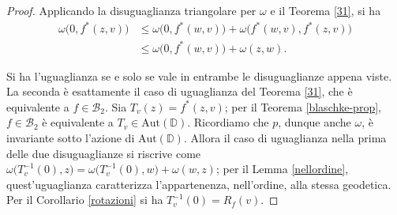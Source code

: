 \begin{proof}
  Applicando la disuguaglianza triangolare per $\omega$ e il Teorema \ref{31}, si ha
  \begin{align*}
    \omega\bigl(0,f^*(z,v)\bigr) & \le \omega\bigl(0,f^*(w,v)\bigr)+\omega\bigl(f^*(w,v),f^*(z,v)\bigr) \\
    & \le \omega\bigl(0,f^*(w,v)\bigr)+\omega(z,w).
  \end{align*}

  Si ha l'uguaglianza se e solo se vale in entrambe le disuguaglianze appena viste. La seconda è esattamente il caso di uguaglianza del Teorema \ref{31}, che è equivalente a $f \in \mathcal{B}_2$. Sia $T_v(z)=f^*(z,v)$; per il Teorema \ref{blaschke-prop}, $f \in \mathcal{B}_2$ è equivalente a $T_v \in \text{Aut}(\mathbb{D})$. Ricordiamo che $p$, dunque anche $\omega$, è invariante sotto l'azione di $\text{Aut}(\mathbb{D})$.
  Allora il caso di uguaglianza nella prima delle due disuguaglianze si riscrive come $\omega\bigl(T_v^{-1}(0),z\bigr)=\omega\bigl(T_v^{-1}(0),w\bigr)+\omega(w,z)$; per il Lemma \ref{nellordine}, quest'uguaglianza caratterizza l'appartenenza, nell'ordine, alla stessa geodetica. Per il Corollario \ref{rotazioni} si ha $T_v^{-1}(0)=R_f(v)$.
\end{proof}

